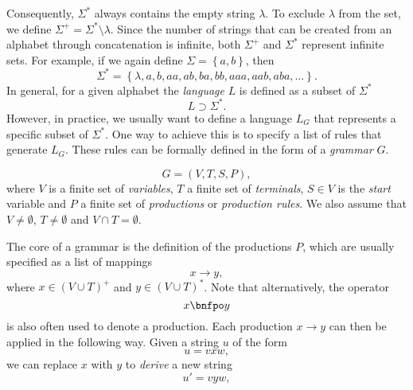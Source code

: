 Consequently, $\Sigma^*$ always contains the empty string $\lambda$.
To exclude $\lambda$ from the set, we define $\Sigma^+ = \Sigma^* \setminus \lambda$.
Since the number of strings that can be created from an alphabet through concatenation is infinite, both $\Sigma^+$ and $\Sigma^*$ represent infinite sets.
For example, if we again define $\Sigma = \left\{a, b\right\}$, then
\begin{equation*}
	\Sigma^{*} = \left\{\lambda, a, b, aa, ab, ba, bb, aaa, aab, aba, \dots \right\}.
\end{equation*} 
In general, for a given alphabet the \emph{language} $L$ is defined as a subset of $\Sigma^*$
\begin{equation}
	L \supset \Sigma^*.
	\label{eq:language-basic-definition}
\end{equation}
However, in practice, we usually want to define a language $L_G$ that represents a specific subset of $\Sigma^*$.
One way to achieve this is to specify a list of rules that generate $L_G$.
These rules can be formally defined in the form of a \emph{grammar} $G$.
\begin{definition}[Grammar]
	\begin{equation}
		G = \left(V, T, S, P \right),
	\end{equation}
	where $V$ is a finite set of \emph{variables},
	$T$ a finite set of \emph{terminals},
	$S \in V$ is the \emph{start} variable and 
	$P$ a finite set of \emph{productions} or \emph{production rules}.
	We also assume that $V \neq \emptyset$, $T \neq \emptyset$ and $V \cap T = \emptyset$.
\end{definition}
The core of a grammar is the definition of the productions $P$, which are usually specified as a list of mappings
\begin{equation*}
	x \to y,
	\label{eq:unrestricted-production}
\end{equation*}
where $x \in \left(V \cup T\right)^+$ and $y \in \left(V \cup T\right)^*$.
Note that alternatively, the operator
\begin{equation*}
	x \bnfpo y
\end{equation*}
is also often used to denote a production.
Each production $x \to y$ can then be applied in the following way.
Given a string $u$ of the form 
\begin{equation*}
	u = vxw,
\end{equation*}
we can replace $x$ with $y$ to \emph{derive} a new string
\begin{equation}
	u' = vyw,
\end{equation}
